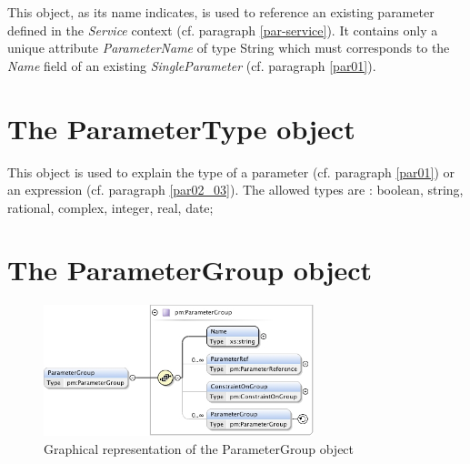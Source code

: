 \documentclass[a4paper,11pt] {ivoa}
\begin{document}
This object, as its name indicates, is used to reference an existing parameter defined in the {\it
Service} context (cf. paragraph
\ref{par-service}). It  contains only a unique attribute {\it ParameterName} of type String which
must corresponds to the {\it Name} field of an existing {\it SingleParameter} (cf. paragraph \ref {par01}).

\section{The ParameterType object}\label{par-ParameterType}
This object is used to explain the type of a parameter (cf. paragraph \ref{par01}) or an expression
(cf. paragraph \ref{par02_03}). The allowed types are : boolean, string, rational, complex,
integer, real, date;

\section{The ParameterGroup object}\label{par-group}

\begin{figure}[htbp]
\begin{center}
\includegraphics[width=0.7\textwidth]{pictures/ParameterGroup.jpg} 
\caption{Graphical representation of the ParameterGroup object}
\label{Pic-ParameterGroup}
\end{center}
\end{figure}
\end{document}
